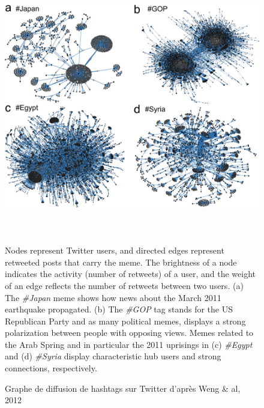 \begin{figure}
    \centering
    \centering
    \includegraphics[width=5.5669in,height=4.4224in]{figures/chap3/chapitre3-img10.jpg}

    Nodes represent Twitter users, and directed edges represent retweeted posts that carry the meme. The brightness of a node indicates the activity (number of retweets) of a user, and the weight of an edge reflects the number of retweets between two users. \newline
    (a) The \textit{\#Japan}  meme shows how news about the March 2011 earthquake propagated. \newline
    (b) The \textit{\#GOP} tag stands for the US Republican Party and as many political memes, displays a strong polarization between people with opposing views. \newline
    Memes related to the Arab Spring and in particular the 2011 uprisings in (c) \textit{\#Egypt} and (d) \textit{\#Syria} display characteristic hub users and strong connections, respectively.
    
    \caption{Graphe de diffusion de hashtags sur Twitter d{\textquoteright}apr\`es Weng \& al, 2012}

\end{figure}


